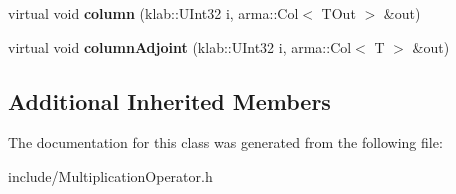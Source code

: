 \begin{DoxyCompactItemize}
\item 
virtual void {\bfseries column} (klab\+::\+U\+Int32 i, arma\+::\+Col$<$ T\+Out $>$ \&out)\hypertarget{classkl1p_1_1TMultiplicationOperator_a73dc928709c2b3b20d92838614e33ca9}{}\label{classkl1p_1_1TMultiplicationOperator_a73dc928709c2b3b20d92838614e33ca9}

\item 
virtual void {\bfseries column\+Adjoint} (klab\+::\+U\+Int32 i, arma\+::\+Col$<$ T $>$ \&out)\hypertarget{classkl1p_1_1TMultiplicationOperator_a573dc2c0559f2bf817987be1af5917f6}{}\label{classkl1p_1_1TMultiplicationOperator_a573dc2c0559f2bf817987be1af5917f6}

\end{DoxyCompactItemize}
\subsection*{Additional Inherited Members}


The documentation for this class was generated from the following file\+:\begin{DoxyCompactItemize}
\item 
include/Multiplication\+Operator.\+h\end{DoxyCompactItemize}
